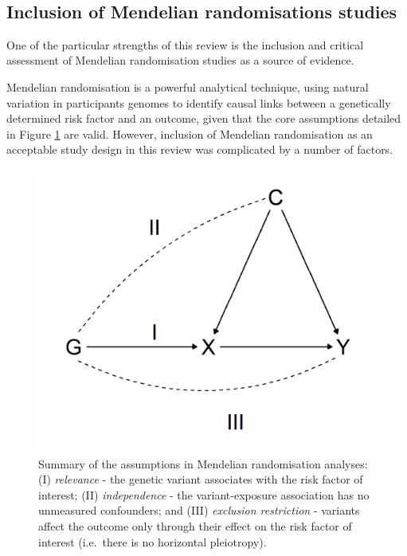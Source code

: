 \documentclass[a4paper, twoside]{templates/ociamthesis}
\begin{document}
~

\hypertarget{rev-discussion-MR}{%
\subsection{Inclusion of Mendelian randomisations studies}\label{rev-discussion-MR}}

One of the particular strengths of this review is the inclusion and critical assessment of Mendelian randomisation studies as a source of evidence.

Mendelian randomisation is a powerful analytical technique, using natural variation in participants genomes to identify causal links between a genetically determined risk factor and an outcome, given that the core assumptions detailed in Figure \ref{fig:mrAssumptions} are valid. However, inclusion of Mendelian randomisation as an acceptable study design in this review was complicated by a number of factors.





\begin{figure}[H]

{\centering \includegraphics[width=0.7\linewidth]{figures/sys-rev/mrAssumptions} 

}

\caption[Overview of assumptions in Mendelian randomisation analyses]{Summary of the assumptions in Mendelian randomisation analyses: (I) \emph{relevance} - the genetic variant associates with the risk factor of interest; (II) \emph{independence} - the variant-exposure association has no unmeasured confounders; and (III) \emph{exclusion restriction} - variants affect the outcome only through their effect on the risk factor of interest (i.e.~there is no horizontal pleiotropy).}\label{fig:mrAssumptions}
\end{figure}
\end{document}
